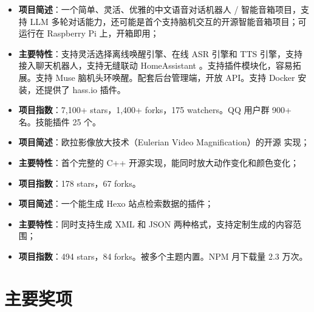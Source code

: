 %
  {
\begin{itemize}
\item \textbf{项目简述}：一个简单、灵活、优雅的中文语音对话机器人 / 智能音箱项目，支持 LLM
  多轮对话能力，还可能是首个支持脑机交互的开源智能音箱项目；可运行在 Raspberry Pi 上，开箱即用；
\item \textbf{主要特性}：支持灵活选择离线唤醒引擎、在线 ASR 引擎和 TTS 引擎，支持
  接入聊天机器人，支持无缝联动 HomeAssistant 。支持插件模块化，容易拓展。支持 Muse 脑机头环唤醒。配套后台管理端，开放 API。支持 Docker 安装，还提供了 hass.io 插件。
\item \textbf{项目指数}：7,100+ stars，1,400+ forks，175 watchers。QQ 用户群 900+ 名。技能插件 25 个。
\end{itemize}}

%
  {
\begin{itemize}
\item \textbf{项目简述}：欧拉影像放大技术（Eulerian Video Magnification）的开源
  实现；
\item \textbf{主要特性}：首个完整的 C++ 开源实现，能同时放大动作变化和颜色变化；
\item \textbf{项目指数}：178 stars，67 forks。
\end{itemize}}

%
  {
\begin{itemize}
\item \textbf{项目简述}：一个能生成 Hexo 站点检索数据的插件；
\item \textbf{主要特性}：同时支持生成 XML 和
  JSON 两种格式，支持定制生成的内容范围；
\item \textbf{项目指数}：494 stars，84 forks。被多个主题内置。NPM 月下载量 2.3 万次。
\end{itemize}}

\section{\hei 主要奖项}


{





}

